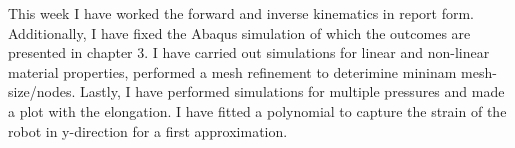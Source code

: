 This week I have worked the forward and inverse kinematics in report form.
Additionally, I have fixed the Abaqus simulation of which the outcomes are presented in chapter 3. I have carried out simulations for linear and non-linear material properties, performed a mesh refinement to deterimine mininam mesh-size/nodes. Lastly, I have performed simulations for multiple pressures and made a plot with the elongation. I have fitted a polynomial to capture the strain of the robot in y-direction for a first approximation. 